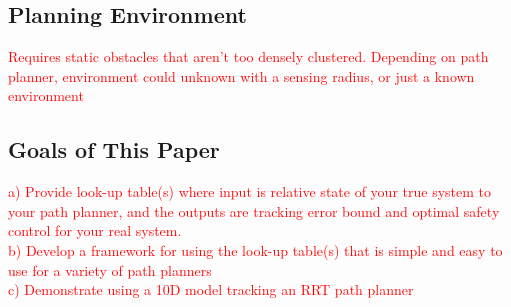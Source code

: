 
\subsection{Planning Environment}
\textcolor{red}{Requires static obstacles that aren't too densely clustered. Depending on path planner, environment could unknown with a sensing radius, or just a known environment}

\subsection{Goals of This Paper}
\textcolor{red}{
	a) Provide look-up table(s) where input is relative state of your true system to your path planner, and the outputs are tracking error bound and optimal safety control for your real system.\\
	b) Develop a framework for using the look-up table(s) that is simple and easy to use for a variety of path planners\\
	c) Demonstrate using a 10D model tracking an RRT path planner}